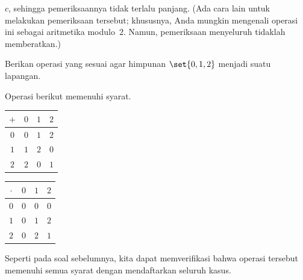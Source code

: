 \begin{exercises}
\begin{answer}
       $c$, sehingga pemeriksaannya tidak terlalu panjang.
       (Ada cara lain untuk melakukan pemeriksaan tersebut; khususnya, Anda
       mungkin mengenali operasi ini sebagai aritmetika modulo~$2$.
       Namun, pemeriksaan menyeluruh tidaklah memberatkan.)
     \end{answer}
  \item 
     Berikan operasi yang sesuai agar himpunan $\set{0,1,2}$
     menjadi suatu lapangan.
     \begin{answer}
       Operasi berikut memenuhi syarat.
       \begin{center}
          \begin{tabular}{c|ccc}
             \( + \) &\( 0 \) &\( 1 \) &$2$ \\
             \hline
             \( 0 \) &\( 0 \) &\( 1 \) &$2$ \\
             \( 1 \) &\( 1 \) &\( 2 \) &$0$ \\
             $2$     &$2$     &$0$     &$1$
          \end{tabular}
          \qquad
          \begin{tabular}{c|ccc}
            \( \cdot \) &\( 0 \) &\( 1 \) &$2$ \\
            \hline
            \( 0 \)  &\( 0 \) &\( 0 \) &$0$ \\
            \( 1 \)  &\( 0 \) &\( 1 \) &$2$ \\
            $2$      &$0$     &$2$     &$1$
          \end{tabular}
       \end{center}
       Seperti pada soal sebelumnya, kita dapat memverifikasi bahwa operasi
       tersebut memenuhi semua syarat dengan mendaftarkan seluruh kasus.
     \end{answer}
\end{exercises}
%
%
